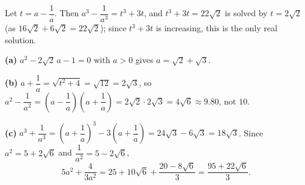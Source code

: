 Let $t=a-\dfrac1a$. Then $a^3-\dfrac1{a^3}=t^3+3t$, and $t^3+3t=22\sqrt2$ is solved by $t=2\sqrt2$ (as $16\sqrt2+6\sqrt2=22\sqrt2$); since $t^3+3t$ is increasing, this is the only real solution.

\textbf{(a)} $a^2-2\sqrt2\,a-1=0$ with $a>0$ gives $a=\sqrt2+\sqrt3$.

\textbf{(b)} $a+\dfrac1a=\sqrt{t^2+4}=\sqrt{12}=2\sqrt3$, so $a^2-\dfrac1{a^2}=\left(a-\dfrac1a\right)\left(a+\dfrac1a\right)=2\sqrt2\cdot2\sqrt3=\boxed{4\sqrt6}\approx9.80$, not $10$.

\textbf{(c)} $a^3+\dfrac1{a^3}=\left(a+\dfrac1a\right)^3-3\left(a+\dfrac1a\right)=24\sqrt3-6\sqrt3=\boxed{18\sqrt3}$. Since $a^2=5+2\sqrt6$ and $\dfrac1{a^2}=5-2\sqrt6$,
\[5a^2+\dfrac{4}{3a^2}=25+10\sqrt6+\dfrac{20-8\sqrt6}{3}=\boxed{\dfrac{95+22\sqrt6}{3}}.\]
